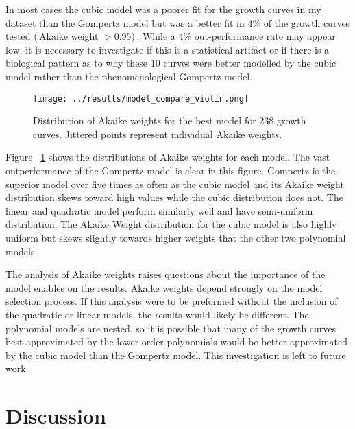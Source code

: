 \documentclass[11pt]{article}
\begin{document}
  In most cases the cubic model was a poorer fit for the growth curves in my dataset than the Gompertz model but was a better fit in 4\% of the growth curves tested (\,Akaike weight $>$0.95)\,. While a 4\% out-performance rate may appear low, it is necessary to investigate if this is a statistical artifact or if there is a biological pattern as to why these 10 curves were better modelled by the cubic model rather than the phenomenological Gompertz model. 

  \begin{figure}[!ht]
    \centering
    \texttt{[image: ../results/model\_compare\_violin.png]}
    \caption{Distribution of Akaike weights for the best model for 238 growth curves. Jittered points represent individual Akaike weights.}
    \label{violin}
   \end{figure}

  Figure ~\ref{violin} shows the distributions of Akaike weights for each model. The vast outperformance of the Gompertz model is clear in this figure. Gompertz is the superior model over five times as often as the cubic model and its Akaike weight distribution skews toward high values while the cubic distribution does not. The linear and quadratic model perform similarly well and have semi-uniform distribution. The Akaike Weight distribution for the cubic model is also highly uniform but skews slightly towards higher weights that the other two polynomial models. 

  The analysis of Akaike weights raises questions about the importance of the model enables on the results. Akaike weights depend strongly on the model selection process. If this analysis were to be preformed without the inclusion of the quadratic or linear models, the results would likely be different. The polynomial models are nested, so it is possible that many of the growth curves best approximated by the lower order polynomials would be better approximated by the cubic model than the Gompertz model. This investigation is left to future work.
  

  \section{Discussion}


  
  
  
\end{document}
